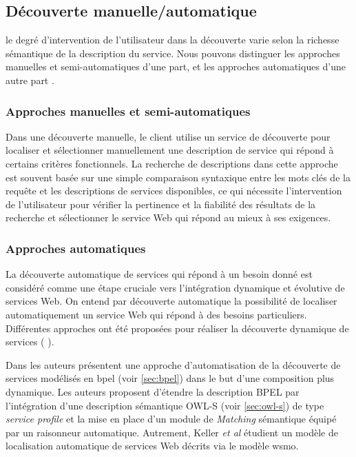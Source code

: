   \subsection{Découverte manuelle/automatique}
  \label{sec:ws-desc:manual-vs-auto}
  le degré d'intervention de l'utilisateur dans la découverte varie
  selon la richesse sémantique de la description du service. Nous
  pouvons distinguer les approches manuelles et semi-automatiques d'une
  part, et les approches automatiques d'une autre part
  \cite{elie2010,garofalakis2004web}.

    \subsubsection{Approches manuelles et semi-automatiques}
    Dans une découverte manuelle, le client utilise un service de
    découverte pour localiser et sélectionner manuellement une
    description de service qui répond à certains critères
    fonctionnels. La recherche de descriptions dans cette approche est
    souvent basée sur une simple comparaison syntaxique entre les mots
    clés de la requête et les descriptions de services disponibles, ce
    qui nécessite l'intervention de l'utilisateur pour vérifier la
    pertinence et la fiabilité des résultats de la recherche et
    sélectionner le service Web qui répond au mieux à ses exigences.

    \subsubsection{Approches automatiques}
    La découverte automatique de services qui répond à un besoin donné
    est considéré comme une étape cruciale vers l'intégration
    dynamique et évolutive de services Web. On entend par découverte
    automatique la possibilité de localiser automatiquement un service 
    Web qui répond à des besoins particuliers. Différentes
    approches ont été proposées pour réaliser la
    découverte dynamique de services ( \cite{paolucci2002semantic,
      bernstein2002discovering, mandell2003bottom,
      benatallah2005automating,keller2005automatic}).\medskip

    Dans \cite{mandell2003bottom} les auteurs présentent une approche
    d'automatisation de la découverte de services modélisés en
    \acrshort{bpel} (voir \ref{sec:bpel}) dans le but d'une
    composition plus dynamique. Les auteurs proposent d'étendre la
    description \textsc{BPEL} par l'intégration d'une description
    sémantique \textsc{OWL-S} (voir \ref{sec:owl-s}) de type
    \textit{service profile} et la mise en place d'un module de
    \textit{Matching} sémantique équipé par un raisonneur
    automatique. Autrement, Keller \textit{et al}
    \cite{keller2005automatic} étudient un modèle de localisation
    automatique de services Web décrits via le modèle \acrshort{wsmo}.

